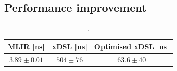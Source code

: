 \subsection{Performance improvement}
\label{sec:specialising-pattern-rewriting-performance}


\begin{table}[H]
  \caption{.}
  \label{tab:constant-folding-optimised}
  \centering
  \begin{tabular}{ccc}
    \toprule
    \textbf{MLIR [ns]} & \textbf{xDSL [ns]} & \textbf{Optimised xDSL [ns]} \\
    \midrule
    $3.89 \pm 0.01$ & $504 \pm 76$ & $63.6 \pm 40$\\
    \bottomrule
  \end{tabular}
\end{table}





